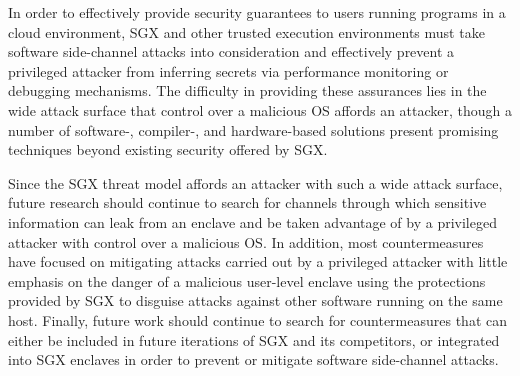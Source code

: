 In order to effectively provide security guarantees to users running programs in a cloud environment, SGX and other trusted execution environments must take software side-channel attacks into consideration and effectively prevent a privileged attacker from inferring secrets via performance monitoring or debugging mechanisms. The difficulty in providing these assurances lies in the wide attack surface that control over a malicious OS affords an attacker, though a number of software-, compiler-, and hardware-based solutions present promising techniques beyond existing security offered by SGX. 

Since the SGX threat model affords an attacker with such a wide attack surface, future research should continue to search for channels through which sensitive information can leak from an enclave and be taken advantage of by a privileged attacker with control over a malicious OS. In addition, most countermeasures have focused on mitigating attacks carried out by a privileged attacker with little emphasis on the danger of a malicious user-level enclave using the protections provided by SGX to disguise attacks against other software running on the same host. Finally, future work should continue to search for countermeasures that can either be included in future iterations of SGX and its competitors, or integrated into SGX enclaves in order to prevent or mitigate software side-channel attacks.
